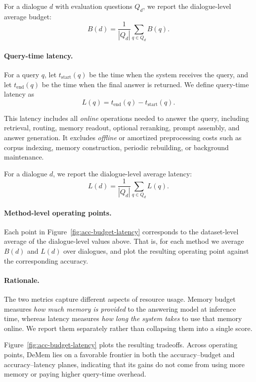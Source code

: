 \documentclass{article}
\theoremstyle{plain}
\theoremstyle{definition}
\theoremstyle{remark}
\begin{document}
For a dialogue $d$ with evaluation questions $Q_d$, we report the dialogue-level average budget:
\[
B(d) = \frac{1}{|Q_d|}\sum_{q \in Q_d} B(q).
\]

\paragraph{Query-time latency.}
For a query $q$, let $t_{\mathrm{start}}(q)$ be the time when the system receives the query, and let $t_{\mathrm{end}}(q)$ be the time when the final answer is returned. 
We define query-time latency as
\[
L(q) = t_{\mathrm{end}}(q) - t_{\mathrm{start}}(q).
\]

This latency includes all \emph{online} operations needed to answer the query, including retrieval, routing, memory readout, optional reranking, prompt assembly, and answer generation. 
It excludes \emph{offline} or amortized preprocessing costs such as corpus indexing, memory construction, periodic rebuilding, or background maintenance.

For a dialogue $d$, we report the dialogue-level average latency:
\[
L(d) = \frac{1}{|Q_d|}\sum_{q \in Q_d} L(q).
\]

\paragraph{Method-level operating points.}
Each point in Figure~\ref{fig:acc-budget-latency} corresponds to the dataset-level average of the dialogue-level values above. 
That is, for each method we average $B(d)$ and $L(d)$ over dialogues, and plot the resulting operating point against the corresponding accuracy.

\paragraph{Rationale.}
The two metrics capture different aspects of resource usage. 
Memory budget measures \emph{how much memory is provided} to the answering model at inference time, whereas latency measures \emph{how long the system takes} to use that memory online. 
We report them separately rather than collapsing them into a single score.


Figure~\ref{fig:acc-budget-latency} plots the resulting tradeoffs.
Across operating points, DeMem lies on a favorable frontier in both the accuracy--budget and accuracy--latency planes, indicating that its gains do not come from using more memory or paying higher query-time overhead.
\end{document}

